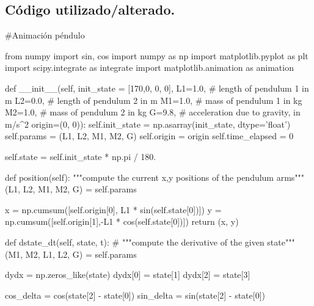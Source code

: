 \documentclass[12pt]{article}
\begin{document}
\subsection*{\textcolor{RubineRed}{Código utilizado/alterado.}}
\begin{boxedverbatim}
#Animación péndulo

from numpy import sin, cos
import numpy as np
import matplotlib.pyplot as plt
import scipy.integrate as integrate
import matplotlib.animation as animation

    def __init__(self,
                 init_state = [170,0, 0, 0],
                 L1=1.0,  # length of pendulum 1 in m
                 L2=0.0,  # length of pendulum 2 in m
                 M1=1.0,  # mass of pendulum 1 in kg
                 M2=1.0,  # mass of pendulum 2 in kg
                 G=9.8,  # acceleration due to gravity, in m/s^2
                 origin=(0, 0)): 
        self.init_state = np.asarray(init_state, dtype='float')
        self.params = (L1, L2, M1, M2, G)
        self.origin = origin
        self.time_elapsed = 0

        self.state = self.init_state * np.pi / 180.
    
    def position(self):
        """compute the current x,y positions of the pendulum arms"""
        (L1, L2, M1, M2, G) = self.params

        x = np.cumsum([self.origin[0], L1 * sin(self.state[0])])
        y = np.cumsum([self.origin[1],-L1 * cos(self.state[0])])
        return (x, y)

    def dstate_dt(self, state, t):
    #    """compute the derivative of the given state"""
        (M1, M2, L1, L2, G) = self.params
    
        dydx = np.zeros_like(state)
        dydx[0] = state[1]
        dydx[2] = state[3]

        cos_delta = cos(state[2] - state[0])
        sin_delta = sin(state[2] - state[0])
 \end{boxedverbatim}
 \pagebreak
 
\end{document}
